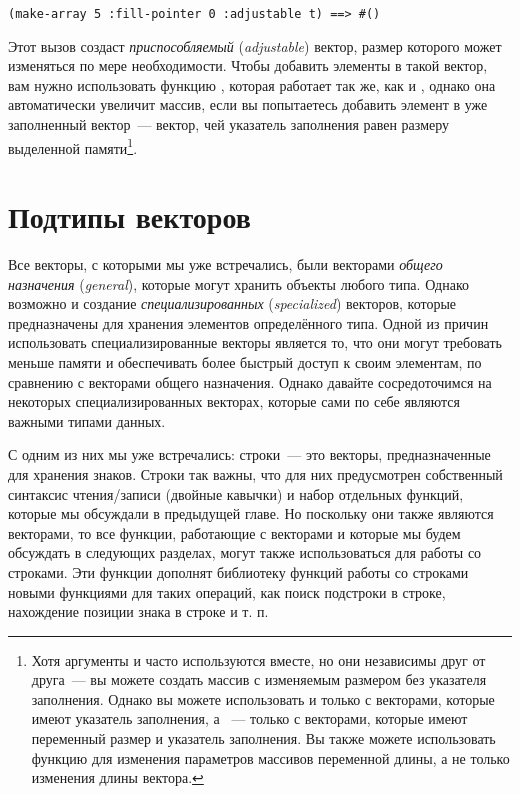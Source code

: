 \begin{lstlisting}[style=lisprepl]
  (make-array 5 :fill-pointer 0 :adjustable t) ==> #()
\end{lstlisting}

Этот вызов создаст \textit{приспособляемый} (\textit{adjustable}) вектор, размер которого
может изменяться по мере необходимости.  Чтобы
добавить элементы в такой вектор, вам нужно использовать функцию
, которая работает так же, как и , однако
она автоматически увеличит массив, если вы попытаетесь добавить элемент в
уже заполненный вектор~--- вектор, чей указатель заполнения равен размеру выделенной
памяти\footnote{Хотя аргументы  и  часто используются
  вместе, но они независимы друг от друга~--- вы можете создать
  массив с изменяемым размером без указателя заполнения.  Однако вы можете использовать
   и  только с векторами, которые имеют указатель
  заполнения, а ~--- только с векторами, которые имеют переменный
  размер и указатель заполнения.  Вы также можете использовать функцию 
  для изменения параметров массивов переменной длины, а не только изменения длины
  вектора.}.


\section{Подтипы векторов}

Все векторы, с которыми мы уже встречались, были векторами \textit{общего назначения}
(\textit{general}), которые могут хранить объекты любого типа.  Однако возможно и
создание \textit{специализированных} (\textit{specialized}) векторов,
которые предназначены для хранения элементов определённого типа.  Одной из
причин использовать специализированные векторы является то, что они могут требовать
меньше памяти и обеспечивать более быстрый доступ к своим элементам, по сравнению с
векторами общего назначения.  Однако давайте сосредоточимся на некоторых
специализированных векторах, которые сами по себе являются важными типами данных.

С одним из них мы уже встречались: строки~--- это векторы, предназначенные для хранения
знаков.  Строки так важны, что для них предусмотрен собственный синтаксис чтения/записи
(двойные кавычки) и набор отдельных функций, которые мы обсуждали в предыдущей главе.  Но
поскольку они также являются векторами, то все функции, работающие с векторами и которые мы
будем обсуждать в следующих разделах, могут также использоваться для работы со строками.
Эти функции дополнят библиотеку функций работы со строками новыми функциями для таких
операций, как поиск подстроки в строке, нахождение позиции знака в строке и т. п.

